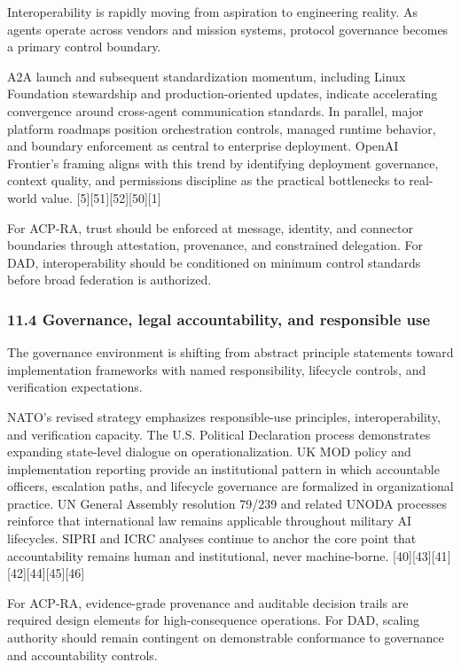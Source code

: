 \documentclass[11pt]{article}
\begin{document}
Interoperability is rapidly moving from aspiration to engineering
reality. As agents operate across vendors and mission systems, protocol
governance becomes a primary control boundary.

A2A launch and subsequent standardization momentum, including Linux
Foundation stewardship and production-oriented updates, indicate
accelerating convergence around cross-agent communication standards. In
parallel, major platform roadmaps position orchestration controls,
managed runtime behavior, and boundary enforcement as central to
enterprise deployment. OpenAI Frontier's framing aligns with this trend
by identifying deployment governance, context quality, and permissions
discipline as the practical bottlenecks to real-world value.
{[}5{]}{[}51{]}{[}52{]}{[}50{]}{[}1{]}

For ACP-RA, trust should be enforced at message, identity, and connector
boundaries through attestation, provenance, and constrained delegation.
For DAD, interoperability should be conditioned on minimum control
standards before broad federation is authorized.

\hypertarget{governance-legal-accountability-and-responsible-use}{%
\subsubsection{11.4 Governance, legal accountability, and responsible
use}\label{governance-legal-accountability-and-responsible-use}}

The governance environment is shifting from abstract principle
statements toward implementation frameworks with named responsibility,
lifecycle controls, and verification expectations.

NATO's revised strategy emphasizes responsible-use principles,
interoperability, and verification capacity. The U.S. Political
Declaration process demonstrates expanding state-level dialogue on
operationalization. UK MOD policy and implementation reporting provide
an institutional pattern in which accountable officers, escalation
paths, and lifecycle governance are formalized in organizational
practice. UN General Assembly resolution 79/239 and related UNODA
processes reinforce that international law remains applicable throughout
military AI lifecycles. SIPRI and ICRC analyses continue to anchor the
core point that accountability remains human and institutional, never
machine-borne. {[}40{]}{[}43{]}{[}41{]}{[}42{]}{[}44{]}{[}45{]}{[}46{]}

For ACP-RA, evidence-grade provenance and auditable decision trails are
required design elements for high-consequence operations. For DAD,
scaling authority should remain contingent on demonstrable conformance
to governance and accountability controls.
\end{document}
